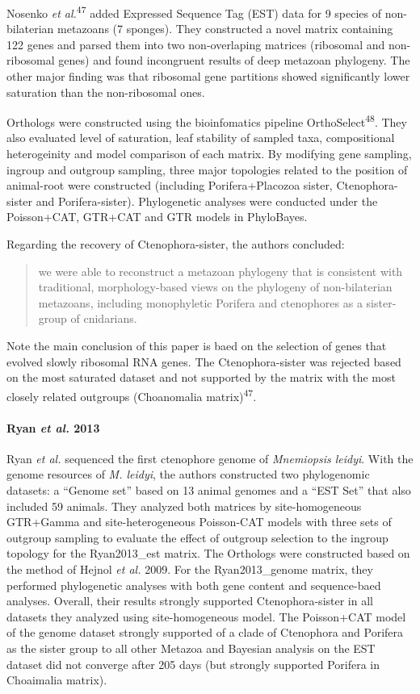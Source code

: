 \documentclass[]{article}
\let\oldparagraph\paragraph
\renewcommand{\paragraph}[1]{\oldparagraph{#1}\mbox{}}
\begin{document}
Nosenko \emph{et al.}\textsuperscript{47} added Expressed Sequence Tag
(EST) data for 9 species of non-bilaterian metazoans (7 sponges). They
constructed a novel matrix containing 122 genes and parsed them into two
non-overlaping matrices (ribosomal and non-ribosomal genes) and found
incongruent results of deep metazoan phylogeny. The other major finding
was that ribosomal gene partitions showed significantly lower saturation
than the non-ribosomal ones.

Orthologs were constructed using the bioinfomatics pipeline
OrthoSelect\textsuperscript{48}. They also evaluated level of
saturation, leaf stability of sampled taxa, compositional heterogeinity
and model comparison of each matrix. By modifying gene sampling, ingroup
and outgroup sampling, three major topologies related to the position of
animal-root were constructed (including Porifera+Placozoa sister,
Ctenophora-sister and Porifera-sister). Phylogenetic analyses were
conducted under the Poisson+CAT, GTR+CAT and GTR models in PhyloBayes.

Regarding the recovery of Ctenophora-sister, the authors concluded:

\begin{quote}
we were able to reconstruct a metazoan phylogeny that is consistent with
traditional, morphology-based views on the phylogeny of non-bilaterian
metazoans, including monophyletic Porifera and ctenophores as a
sister-group of cnidarians.
\end{quote}

Note the main conclusion of this paper is baed on the selection of genes
that evolved slowly ribosomal RNA genes. The Ctenophora-sister was
rejected based on the most saturated dataset and not supported by the
matrix with the most closely related outgroups (Choanomalia
matrix)\textsuperscript{47}.

\hypertarget{ryan-et-al.-2013}{%
\paragraph{\texorpdfstring{Ryan \emph{et al.}
2013}{Ryan et al. 2013}}\label{ryan-et-al.-2013}}

Ryan \emph{et al.} sequenced the first ctenophore genome of
\emph{Mnemiopsis leidyi}. With the genome resources of \emph{M. leidyi},
the authors constructed two phylogenomic datasets: a ``Genome set''
based on 13 animal genomes and a ``EST Set'' that also included 59
animals. They analyzed both matrices by site-homogeneous GTR+Gamma and
site-heterogeneous Poisson-CAT models with three sets of outgroup
sampling to evaluate the effect of outgroup selection to the ingroup
topology for the Ryan2013\_est matrix. The Orthologs were constructed
based on the method of Hejnol \emph{et al.} 2009. For the
Ryan2013\_genome matrix, they performed phylogenetic analyses with both
gene content and sequence-baed analyses. Overall, their results strongly
supported Ctenophora-sister in all datasets they analyzed using
site-homogeneous model. The Poisson+CAT model of the genome dataset
strongly supported of a clade of Ctenophora and Porifera as the sister
group to all other Metazoa and Bayesian analysis on the EST dataset did
not converge after 205 days (but strongly supported Porifera in
Choaimalia matrix).
\end{document}
